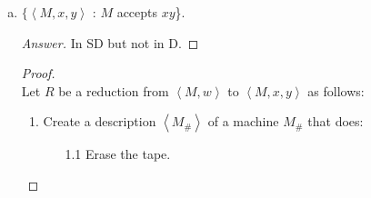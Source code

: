 \documentclass[10pt]{article}
\newcommand{\brackets}[1]{\left< #1 \right>}
\begin{document}
\begin{enumerate}[1)]
\begin{enumerate}[a)]
\begin{proof}[Proof]
Assume there is a machine $Oracle(\brackets{M})$ that decides this language.  Then for any language-string pair $\brackets{M, w}$ consider $C = oracle(R(\brackets{M, w}))$.\\

If $\brackets{M, w} \in$ H: $M_\#$ accepts exactly two strings. Oracle accepts.
If $\brackets{M, w} \not \in$ H: $M_\#$ accepts no strings.  Oracle rejects.

Therefore $C$ decides H so $Oracle$ must not exist.

\newpage
To prove that this language is not $\in$ SD:\\

Create a reduction $R$ from $\brackets{M, w}$ to $\brackets{M_\#}$ as follows.\\
Create a description $\brackets{M_\#}$ of a machine $M_\#(x)$ that does this: \\
\begin{center}
\begin{enumerate}[1.]
\item
If $x$ is \texttt{a} or \texttt{aa} accept.

\item
Erase input

\item
Write $w$ on tape.

\item
Run $M$ on $w$.

\item
Accept
\end{enumerate}
\end{center}
$R$ returns $M_\#$\\
Assume there is a machine $Oracle(\brackets{M})$ that decides this language.  Then for any language-string pair $\brackets{M, w}$ consider $C = oracle(R(\brackets{M, w}))$.\\

If $\brackets{M, w} \in \lnot$ H: $M_\#$ Accepts exactly two strings and loops on all others.  Oracle accepts.\\
If $\brackets{M, w} \not \in \lnot$ H: $M_\#$ Accepts all strings.  Oracle rejects.\\

Therefore $C$ semi-decides $\lnot$H so $Oracle$ must not exist.
\end{proof}

\item
$\{\brackets{M, x, y}$ : $M$ accepts $xy$\}.
\begin{proof}[Answer]
In SD but not in D.
\end{proof}
\begin{proof}[Proof]$ $\\
Let $R$ be a reduction from $\brackets{M, w}$ to $\brackets{M, x, y}$ as follows:
\begin{enumerate}[1.]
\item
Create a description $\brackets{M_\#}$ of a machine $M_\#$ that does:
\begin{enumerate}
\item[1.1]
Erase the tape.


\end{enumerate}
\end{enumerate}
\end{proof}
\end{enumerate}
\end{enumerate}
\end{document}
